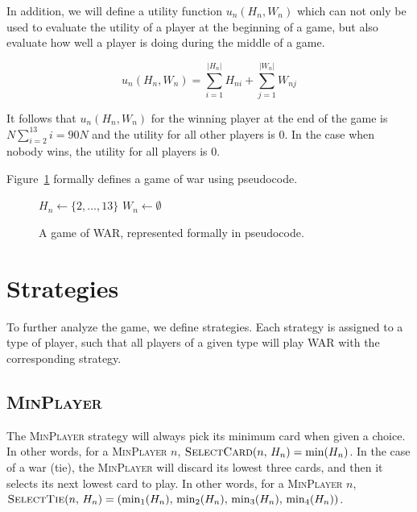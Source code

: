 \documentclass[conference]{IEEEtran}
\let\geq=\geqslant
\newcommand\MinP{\textsc{MinPlayer}}
\begin{document}
In addition, we will define a utility function $u_n(H_n, W_n)$ which can not only
be used to evaluate the utility of a player at the beginning of a game, but
also evaluate how well a player is doing during the middle of a game.

\begin{displaymath}
    u_n(H_n, W_n) = \sum_{i=1}^{|H_n|}{H_{ni}} + \sum_{j=1}^{|W_n|}{W_{nj}}
\end{displaymath}

It follows that $u_n(H_n, W_n)$ for the winning player at the end of the game
is $N\sum_{i=2}^{13}{i} = 90N$ and the utility for all other players is $0$. In
the case when nobody wins, the utility for all players is $0$.

Figure~\ref{alg:war} formally defines a game of war using pseudocode.

\begin{figure}
    \begin{algorithmic}
        \State {}
            \State $H_n \gets \{2, \ldots, 13\}$
            \State $W_n \gets \emptyset$
        \EndFor
        \While{$|\left\{H_n \,:\, n \in \left\{1, \ldots, N\right\} \,|\, |H_n| \geq 1\right\}| \geq 2$}
        \State{}
        \EndWhile
        \EndProcedure
    \end{algorithmic}
    \caption{A game of WAR, represented formally in pseudocode.}
    \label{alg:war}
\end{figure}

\section{Strategies}
To further analyze the game, we define strategies. Each strategy is assigned
to a type of player, such that all players of a given type will play WAR with
the corresponding strategy.

\subsection{\MinP}
The \MinP{} strategy will always pick its minimum card when
given a choice. In other words, for a \MinP{} $n$, $\textsc{SelectCard}(n,\,H_n) = \min(H_n)$.
In the case of a war (tie), the \MinP{} will discard
its lowest three cards, and then it selects its next lowest card to play.
In other words, for a \MinP{} $n$, $\textsc{SelectTie}(n,\,H_n) = (\min_1(H_n),\,\min_2(H_n),\,\min_3(H_n),\,\min_4(H_n))$.
\end{document}
